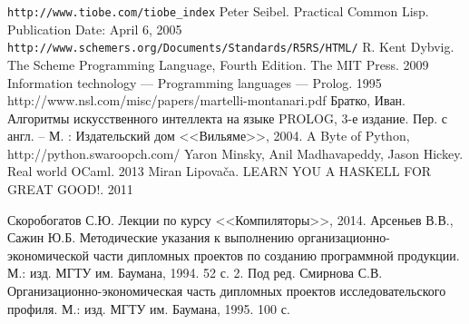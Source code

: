 \begin{thebibliography}{0}
    \verb$http://www.tiobe.com/tiobe_index$
    Peter Seibel. Practical Common Lisp. Publication Date: April 6, 2005
    \verb$http://www.schemers.org/Documents/Standards/R5RS/HTML/$
    R. Kent Dybvig. The Scheme Programming Language, Fourth Edition. The MIT Press. 2009
    Information technology — Programming languages — Prolog. 1995
    http://www.nsl.com/misc/papers/martelli-montanari.pdf
    Братко, Иван. Алгоритмы искусственного интеллекта на языке PROLOG, 3-е издание. Пер. с англ. -- М. : Издательский дом <<Вильяме>>, 2004.
    A Byte of Python, http://python.swaroopch.com/
    Yaron Minsky, Anil Madhavapeddy, Jason Hickey. Real world OCaml. 2013
    Miran Lipovača. LEARN YOU A HASKELL FOR GREAT GOOD!. 2011 

     Скоробогатов С.Ю. Лекции по курсу <<Компиляторы>>, 2014.
     Арсеньев В.В., Сажин Ю.Б. Методические указания к выполнению организационно-экономической части дипломных проектов по созданию программной продукции. М.: изд. МГТУ им. Баумана, 1994. 52 с. 2.
     Под ред. Смирнова С.В. Организационно-экономическая часть дипломных проектов исследовательского профиля. М.: изд. МГТУ им. Баумана, 1995. 100 с.
\end{thebibliography}
